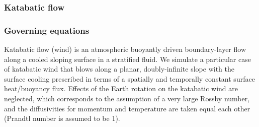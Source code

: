 \documentclass[gmd]{copernicus}
\begin{document}

\subsubsection{Katabatic flow}
\subsubsection{Governing equations}

\noindent Katabatic flow (wind) is an atmospheric buoyantly driven boundary-layer flow along a cooled sloping surface in a stratified fluid. We simulate a particular case of katabatic wind that blows along a planar, doubly-infinite slope with the surface cooling prescribed in terms of a spatially and temporally constant surface heat/buoyancy flux. Effects of the Earth rotation on the katabatic wind are neglected, which corresponds to the assumption of a very large Rossby number, and the diffusivities for momentum and temperature are taken equal each other (Prandtl number is assumed to be 1). 
\end{document}
